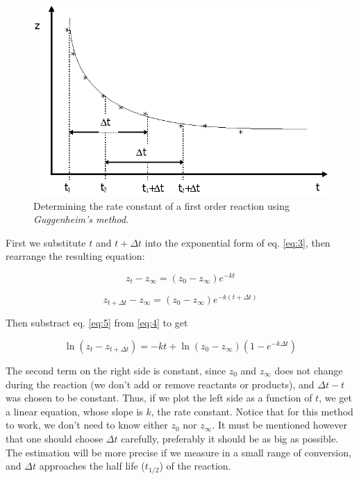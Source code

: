 \begin{figure}[h]
\centering
\label{fig_els2}
\includegraphics{fig/els2.eps}
\caption{Determining the rate constant of a first order reaction using \emph{Guggenheim's method}.}
\end{figure}

First we substitute $t$ and $t + \Delta t$ into the exponential form of eq. \ref{eq:3}, then rearrange the resulting equation:

\begin{equation}
\label{eq:4}
	z_t - z_{\infty}
	=
	(z_0 - z_{\infty}) e^{-kt}
\end{equation}

\begin{equation}
\label{eq:5}
	z_{t + \Delta t} - z_{\infty} = (z_0 - z_{\infty}) e^{-k(t+\Delta t)}
\end{equation}

Then substract eq. \ref{eq:5} from \ref{eq:4} to get

\begin{equation}
\label{eq:6}
        \ln (z_t - z_{t+\Delta t})
	=
	-kt
	+ \ln (z_0 - z_{\infty}) (1- e^{-k \Delta t})
\end{equation}

The second term on the right side is constant, since $z_0$ and $z_\infty$ does not change during the reaction (we don't add or remove reactants or products), and $\Delta t - t$ was chosen to be constant.
Thus, if we plot the left side as a function of $t$, we get a linear equation, whose slope is $k$, the rate constant.
Notice that for this method to work, we don't need to know either $z_0$ nor $z_\infty$. 
It must be mentioned however that one should choose $\Delta t$ carefully, preferably it should be as big as possible.
The estimation will be more precise if we measure in a small range of conversion, and $\Delta t$ approaches the half life ($t_{1/2}$) of the reaction.

